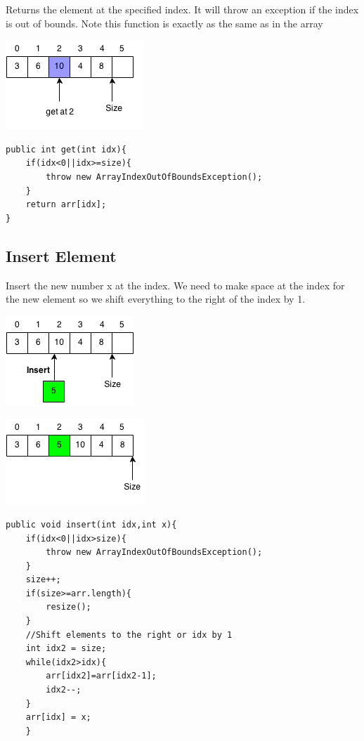 \documentclass[11pt,oneside]{book}
\makeatletter
\def\maxwidth#1{\ifdim\Gin@nat@width>#1 #1\else\Gin@nat@width\fi}
\makeatother
\begin{document}
Returns the element at the specified index. It will throw an exception if the index is out of bounds. Note this function is exactly as the same as in the array

\vspace{5px}\includegraphics[width=\maxwidth{\textwidth}]{vectorget.png}

\begin{lstlisting}
public int get(int idx){
    if(idx<0||idx>=size){
        throw new ArrayIndexOutOfBoundsException();
    }   
    return arr[idx];
}
\end{lstlisting}

\subsection{Insert Element}

Insert the new number x at the index. We need to make space at the index for the new element so we shift everything to the right of the index by 1.

\vspace{5px}\includegraphics[width=\maxwidth{\textwidth}]{vectorinsert.png}

\vspace{5px}\includegraphics[width=\maxwidth{\textwidth}]{vectorinsert2.png}

\begin{lstlisting}
public void insert(int idx,int x){
    if(idx<0||idx>size){
        throw new ArrayIndexOutOfBoundsException();
    }
    size++;
    if(size>=arr.length){
        resize();
    }
    //Shift elements to the right or idx by 1
    int idx2 = size;
    while(idx2>idx){
        arr[idx2]=arr[idx2-1];
        idx2--;
    }   
    arr[idx] = x;
    }
\end{lstlisting}
\end{document}
